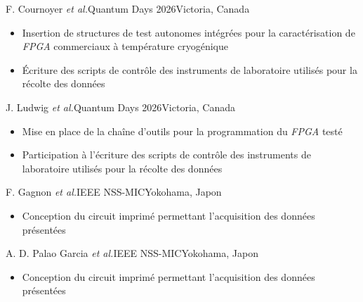 
{F. Cournoyer \textit{et al.}}{Quantum Days 2026}{Victoria, Canada}
{\vspace{-12pt}
\begin{itemize}
    \item Insertion de structures de test autonomes intégrées pour la caractérisation de \textit{FPGA} commerciaux à température cryogénique
    \item Écriture des scripts de contrôle des instruments de laboratoire utilisés pour la récolte des données
\end{itemize}}

{J. Ludwig \textit{et al.}}{Quantum Days 2026}{Victoria, Canada}
{\vspace{-12pt}
\begin{itemize}
    \item Mise en place de la chaîne d'outils pour la programmation du \textit{FPGA} testé
    \item Participation à l'écriture des scripts de contrôle des instruments de laboratoire utilisés pour la récolte des données
\end{itemize}}

{F. Gagnon \textit{et al.}}{IEEE NSS-MIC}{Yokohama, Japon}
{\vspace{-12pt}
\begin{itemize}
    \item Conception du circuit imprimé permettant l'acquisition des données présentées
\end{itemize}}

{A. D. Palao Garcia \textit{et al.}}{IEEE NSS-MIC}{Yokohama, Japon}
{\vspace{-12pt}
\begin{itemize}
    \item Conception du circuit imprimé permettant l'acquisition des données présentées
\end{itemize}}
